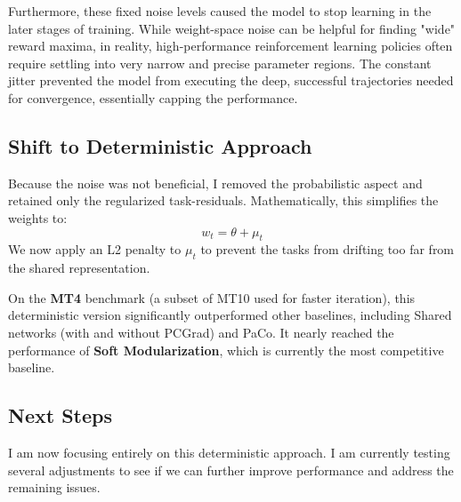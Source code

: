 \documentclass[11pt,a4paper]{article}
\begin{document}
Furthermore, these fixed noise levels caused the model to stop learning in the later stages of training. While weight-space noise can be helpful for finding "wide" reward maxima, in reality, high-performance reinforcement learning policies often require settling into very narrow and precise parameter regions. The constant jitter prevented the model from executing the deep, successful trajectories needed for convergence, essentially capping the performance.

\subsection{Shift to Deterministic Approach}
Because the noise was not beneficial, I removed the probabilistic aspect and retained only the regularized task-residuals. Mathematically, this simplifies the weights to:
\[ w_t = \theta + \mu_t \]
We now apply an L2 penalty to $\mu_t$ to prevent the tasks from drifting too far from the shared representation.

On the \textbf{MT4} benchmark (a subset of MT10 used for faster iteration), this deterministic version significantly outperformed other baselines, including Shared networks (with and without PCGrad) and PaCo. It nearly reached the performance of \textbf{Soft Modularization}, which is currently the most competitive baseline.

\subsection{Next Steps}
I am now focusing entirely on this deterministic approach. I am currently testing several adjustments to see if we can further improve performance and address the remaining issues.
\end{document}
